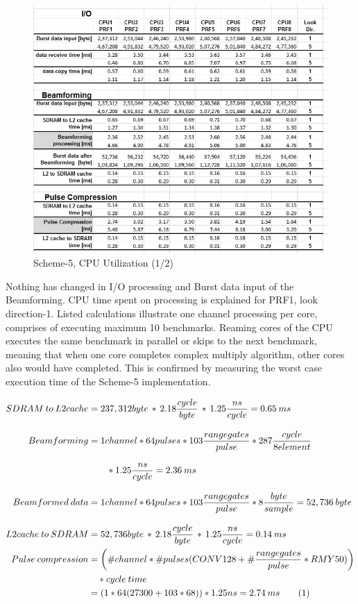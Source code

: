 \begin{figure}[h!]
	\centering
	\includegraphics[width=160mm]{figures/scheme5_cpu_util1}
	\caption{Scheme-5, CPU Utilization (1/2)}
	\label{fig:mm:scheme5_cpu_util1}
\end{figure}
Nothing has changed in I/O processing and Burst data input of the Beamforming. CPU time spent on processing is explained for PRF1, look direction-1. Listed calculations illustrate one channel processing per core, comprises of executing maximum 10 benchmarks. Reaming cores of the CPU executes the same benchmark in parallel or skips to the next benchmark, meaning that when one core completes complex multiply algorithm, other cores also would have completed. This is confirmed by measuring the worst case execution time of the Scheme-5 implementation.

\begin{align*}
\label{aa:scheme5:equ1}
	SDRAM \: to \: L2cache &= 237,312 byte \, * \, 2.18\frac{cycle}{byte} \, * \, 1.25\frac{ns}{cycle} = 0.65 \: ms \\[0.3cm]
	Beamforming &= 1channel * 64pulses * 103 \frac{range gates}{pulse} * 287\frac{cycle}{8 element} \\[0.3cm] 
	&\qquad * 1.25\frac{ns}{cycle} = 2.36 \: ms\\[0.3cm]
	Beamformed \: data &= 1channel * 64pulses * 103 \frac{range gates}{pulse} *8\frac{byte}{sample} = 52,736 \: byte \\[0.3cm]
	L2cache \: to \: SDRAM &= 52,736 byte \, * \, 2.18\frac{cycle}{byte} \, * \, 1.25\frac{ns}{cycle} = 0.14 \: ms \\
	Pulse \: compression &= \bigg(\#channel * \#pulses (CONV128 +  \# \frac{range gates}{pulse} * RMY50)\bigg) \\
			& \quad * cycle \: time \\
			&= (1 * 64 (27300 + 103 * 68)) * 1.25ns = 2.74 \: ms \stepcounter{equation}\tag{\theequation} 
\end{align*}

